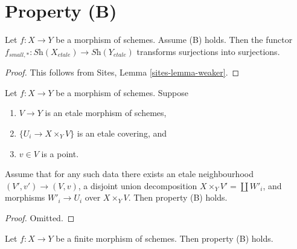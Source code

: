\section{Property (B)}
\label{section-B}

\begin{lemma}
\label{lemma-property-B-implies}
Let $f : X \to Y$ be a morphism of schemes. Assume (B) holds.
Then the functor
$f_{small, *} : \textit{Sh}(X_{etale}) \to \textit{Sh}(Y_{etale})$
transforms surjections into surjections.
\end{lemma}

\begin{proof}
This follows from
Sites, Lemma \ref{sites-lemma-weaker}.
\end{proof}

\begin{lemma}
\label{lemma-simplify-B}
Let $f : X \to Y$ be a morphism of schemes. Suppose
\begin{enumerate}
\item $V \to Y$ is an etale morphism of schemes,
\item $\{U_i \to X \times_Y V\}$ is an etale covering, and
\item $v \in V$ is a point.
\end{enumerate}
Assume that for any such data there exists an etale neighbourhood
$(V', v') \to (V, v)$, a disjoint union decomposition
$X \times_Y V' = \coprod W'_i$, and morphisms $W'_i \to U_i$
over $X \times_Y V$. Then property (B) holds.
\end{lemma}

\begin{proof}
Omitted.
\end{proof}

\begin{lemma}
\label{lemma-finite-B}
Let $f : X \to Y$ be a finite morphism of schemes.
Then property (B) holds.
\end{lemma}

